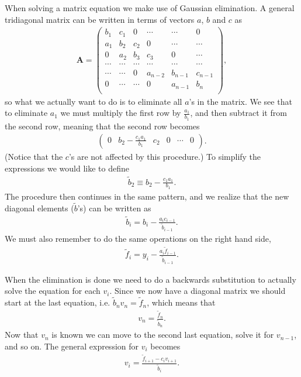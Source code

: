 \documentclass[12pt, a4paper]{article}
\begin{document}
When solving a matrix equation we make use of Gaussian elimination. A general tridiagonal matrix can be 
written in terms of vectors $a$, $b$ and $c$ as  
\begin{align*}
\mathbf{A} = \left(\begin{array}{cccccc}
b_1 & c_1 & 0 & \cdots & \cdots & 0 \\ 
a_1 & b_2 & c_2 & 0 & \cdots & \cdots \\ 
0 & a_2 & b_3 & c_3 & 0 & \cdots \\
\cdots & \cdots & \cdots & \cdots & \cdots & \cdots \\              
\cdots & \cdots  & 0 & a_{n-2} & b_{n-1} & c_{n-1} \\ 
0 & \cdots & \cdots & 0 & a_{n-1} & b_n \\  
\end{array} \right), 
\end{align*}
so what we actually want to do is to eliminate all $a$'s in the matrix. We see that to eliminate $a_1$ 
we must multiply the first row by $\frac{a_1}{b_1}$, and then subtract it from the second row, meaning that 
the second row becomes 
\begin{align*}
\left( \begin{array}{cccccc}
0 & b_2 - \frac{c_1 a_1}{b_1} & c_2 & 0 & \cdots & 0 
\end{array} \right). 
\end{align*}
(Notice that the $c$'s are not affected by this procedure.)  
To simplify the expressions we would like to define 
\begin{align*}
\tilde{b}_2 \equiv b_2 - \frac{c_1 a_1}{b_1}.  
\end{align*}
The procedure then continues in the same pattern, and we realize that the new diagonal elements 
($\tilde{b}$'s) can be written as   
\begin{align}
\tilde{b}_i = b_i - \frac{a_i c_{i-1}}{\tilde{b}_{i-1}}. 
\label{btilde}
\end{align}
We must also remember to do the same operations on the right hand side, 
\begin{align}
\tilde{f}_i = y_i - \frac{a_i \tilde{f}_{i-1}}{\tilde{b}_{i-1}}. 
\label{ftilde}
\end{align}

When the elimination is done we need to do a backwards substitution to actually solve the equation for 
each $v_i$. Since we now have a diagonal matrix we should start at the last equation, i.e. 
$\tilde{b}_n v_n = \tilde{f}_n$, which means that 
\begin{align*}
v_n = \frac{\tilde{f}_n}{\tilde{b}_n}. 
\end{align*} 
Now that $v_n$ is known we can move to the second last equation, solve it for $v_{n-1}$, and so on. The 
general expression for $v_i$ becomes 
\begin{align*}
v_i = \frac{\tilde{f}_{i+1} - c_i v_{i+1}}{\tilde{b}_i}.
\label{vi} 
\end{align*}
\end{document}
